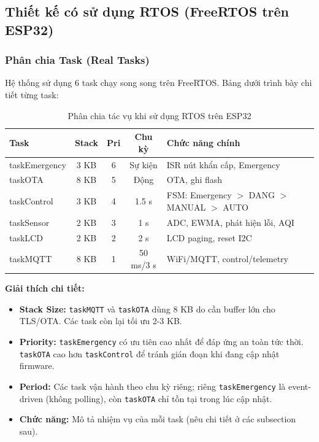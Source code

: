 \documentclass[../BTL_PTIT.tex]{subfiles}
\begin{document}
\subsection{Thiết kế có sử dụng RTOS (FreeRTOS trên ESP32)}
\subsubsection{Phân chia Task (Real Tasks)}
Hệ thống sử dụng 6 task chạy song song trên FreeRTOS. Bảng dưới trình bày chi tiết từng task:

\begin{table}[H]
\centering
\caption{Phân chia tác vụ khi sử dụng RTOS trên ESP32}
\label{tab:real_tasks_rtos}
\begin{tabular}{|l|c|c|c|l|}
\hline
\textbf{Task} & \textbf{Stack} & \textbf{Pri} & \textbf{Chu kỳ} & \textbf{Chức năng chính} \\
\hline
taskEmergency & 3 KB & 6 & Sự kiện & ISR nút khẩn cấp, Emergency \\
taskOTA & 8 KB & 5 & Động & OTA, ghi flash \\
taskControl & 3 KB & 4 & 1.5 s & FSM: Emergency $>$ DANG $>$ MANUAL $>$ AUTO \\
taskSensor & 2 KB & 3 & 1 s & ADC, EWMA, phát hiện lỗi, AQI \\
taskLCD & 2 KB & 2 & 2 s & LCD paging, reset I2C \\
taskMQTT & 8 KB & 1 & 50 ms/3 s & WiFi/MQTT, control/telemetry \\
\hline
\end{tabular}
\end{table}

\textbf{Giải thích chi tiết:}
\begin{itemize}[label=\textbullet]
    \item \textbf{Stack Size:} \texttt{taskMQTT} và \texttt{taskOTA} dùng 8 KB do cần buffer lớn cho TLS/OTA. Các task còn lại tối ưu 2-3 KB.
    
    \item \textbf{Priority:} \texttt{taskEmergency} có ưu tiên cao nhất để đáp ứng an toàn tức thời. \texttt{taskOTA} cao hơn \texttt{taskControl} để tránh gián đoạn khi đang cập nhật firmware.
    
    \item \textbf{Period:} Các task vận hành theo chu kỳ riêng; riêng \texttt{taskEmergency} là event-driven (không polling), còn \texttt{taskOTA} chỉ tồn tại trong lúc cập nhật.
    
    \item \textbf{Chức năng:} Mô tả nhiệm vụ của mỗi task (nêu chi tiết ở các subsection sau).
\end{itemize}
\end{document}

